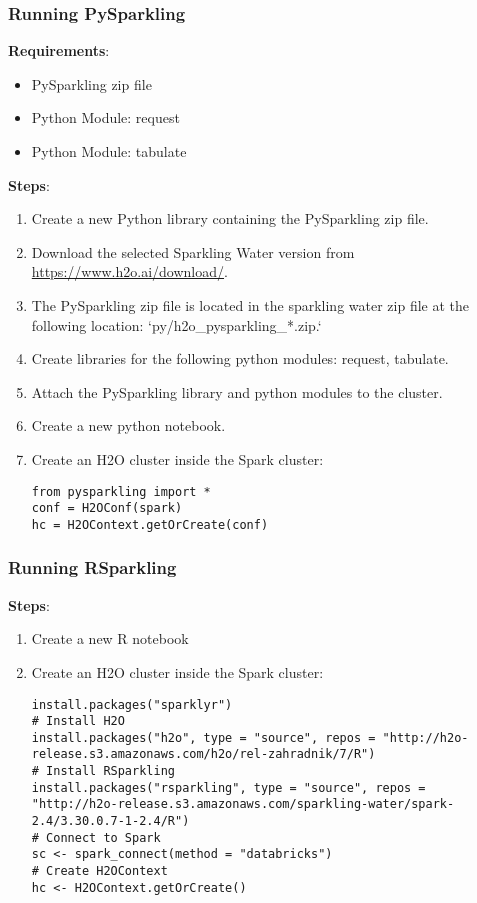 \subsubsection{Running PySparkling}

\textbf{Requirements}:
\begin{itemize}
\item PySparkling zip file
\item Python Module: request
\item Python Module: tabulate
\end{itemize}

\textbf{Steps}:
\begin{enumerate}
\item Create a new Python library containing the PySparkling zip file.
\item Download the selected Sparkling Water version from \url{https://www.h2o.ai/download/}.
\item The PySparkling zip file is located in the sparkling water zip file at the following location: `py/h2o\_pysparkling\_*.zip.`
\item Create libraries for the following python modules: request, tabulate.
\item Attach the PySparkling library and python modules to the cluster.
\item Create a new python notebook.
\item Create an H2O cluster inside the Spark cluster:
\begin{lstlisting}[style=Python]
from pysparkling import *
conf = H2OConf(spark)
hc = H2OContext.getOrCreate(conf)
\end{lstlisting}

\end{enumerate}

\subsubsection{Running RSparkling}

\textbf{Steps}:
\begin{enumerate}
  \item Create a new R notebook
  \item Create an H2O cluster inside the Spark cluster:
  \begin{lstlisting}[style=R]
install.packages("sparklyr")
# Install H2O
install.packages("h2o", type = "source", repos = "http://h2o-release.s3.amazonaws.com/h2o/rel-zahradnik/7/R")
# Install RSparkling
install.packages("rsparkling", type = "source", repos = "http://h2o-release.s3.amazonaws.com/sparkling-water/spark-2.4/3.30.0.7-1-2.4/R")
# Connect to Spark
sc <- spark_connect(method = "databricks")
# Create H2OContext
hc <- H2OContext.getOrCreate()
  \end{lstlisting}

\end{enumerate}